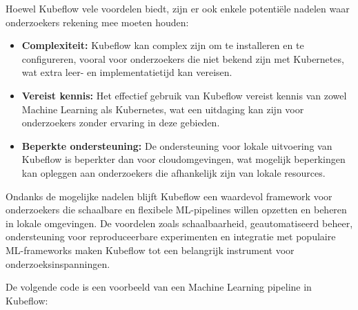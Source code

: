 Hoewel Kubeflow vele voordelen biedt, zijn er ook enkele potentiële nadelen waar onderzoekers rekening mee moeten houden:
\begin{itemize}
    \item \textbf{Complexiteit:} Kubeflow kan complex zijn om te installeren en te configureren, vooral voor onderzoekers die niet bekend zijn met Kubernetes, wat extra leer- en implementatietijd kan vereisen.
    \item \textbf{Vereist kennis:} Het effectief gebruik van Kubeflow vereist kennis van zowel Machine Learning als Kubernetes, wat een uitdaging kan zijn voor onderzoekers zonder ervaring in deze gebieden.
    \item \textbf{Beperkte ondersteuning:} De ondersteuning voor lokale uitvoering van Kubeflow is beperkter dan voor cloudomgevingen, wat mogelijk beperkingen kan opleggen aan onderzoekers die afhankelijk zijn van lokale resources.
\end{itemize}
Ondanks de mogelijke nadelen blijft Kubeflow een waardevol framework voor onderzoekers die schaalbare en flexibele ML-pipelines willen opzetten en beheren in lokale omgevingen. De voordelen zoals schaalbaarheid, geautomatiseerd beheer, ondersteuning voor reproduceerbare experimenten en integratie met populaire ML-frameworks maken Kubeflow tot een belangrijk instrument voor onderzoeksinspanningen.

De volgende code is een voorbeeld van een Machine Learning pipeline in Kubeflow:

